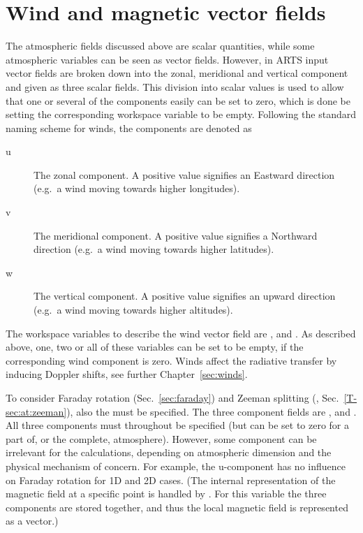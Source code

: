 \section{Wind and magnetic vector fields}
\label{sec:atm:vecfields}
%
The atmospheric fields discussed above are scalar quantities, while some
atmospheric variables can be seen as vector fields. However, in ARTS input
vector fields are broken down into the zonal, meridional and vertical component
and given as three scalar fields. This division into scalar values is used to
allow that one or several of the components easily can be set to zero, which is
done be setting the corresponding workspace variable to be empty. Following the
standard naming scheme for winds, the components are denoted as
\begin{description}
\item[u] The zonal component. A positive value signifies an Eastward direction
  (e.g.\ a wind moving towards higher longitudes).
\item[v] The meridional component. A positive value signifies a Northward
  direction (e.g.\ a wind moving towards higher latitudes).
\item[w] The vertical component. A positive value signifies an upward direction
  (e.g.\ a wind moving towards higher altitudes).
\end{description}


The workspace variables to describe the wind vector field are
,  and
. As described above, one, two or all of these
variables can be set to be empty, if the corresponding wind component is zero.
Winds affect the radiative transfer by inducing Doppler shifts, see further
Chapter~\ref{sec:winds}. 


To consider Faraday rotation (Sec.~\ref{sec:faraday}) and Zeeman splitting
(\theory, Sec.~\ref{T-sec:at:zeeman}), also the  must
be specified. The three component fields are ,
 and . All three components
must throughout be specified (but can be set to zero for a part of, or the
complete, atmosphere). However, some component can be irrelevant for the
calculations, depending on atmospheric dimension and the physical mechanism of
concern. For example, the u-component has no influence on Faraday rotation for
1D and 2D cases. (The internal representation of the magnetic field at a
specific point is handled by . For this variable the three
components are stored together, and thus the local magnetic field is
represented as a vector.)



